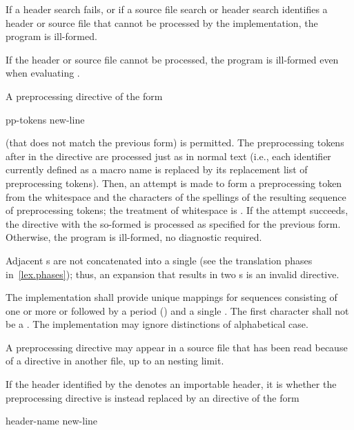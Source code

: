 \pnum
If a header search fails, or if a source file search or header search
identifies a header or source file that cannot be processed by the implementation,
the program is ill-formed.
\begin{note}
If the header or source file cannot be processed,
the program is ill-formed even when evaluating .
\end{note}

\pnum
A preprocessing directive of the form
\begin{ncsimplebnf}
 pp-tokens new-line
\end{ncsimplebnf}
(that does not match the previous form) is permitted.
The preprocessing tokens after
in the directive are processed just as in normal text
(i.e., each identifier currently defined as a macro name is replaced by its
replacement list of preprocessing tokens).
Then, an attempt is made to form a 
preprocessing token from the whitespace and the characters
of the spellings of the resulting sequence of preprocessing tokens;
the treatment of whitespace
is .
If the attempt succeeds, the directive with the so-formed 
is processed as specified for the previous form.
Otherwise, the program is ill-formed, no diagnostic required.
\begin{note}
Adjacent s are not concatenated into
a single 
(see the translation phases in~\ref{lex.phases});
thus, an expansion that results in two s is an
invalid directive.
\end{note}

\pnum
The implementation shall provide unique mappings for
sequences consisting of one or more
 or 
followed by a period
()
and a single
.
The first character shall not be a .
The implementation may ignore distinctions of alphabetical case.

\pnum
A
preprocessing directive may appear
in a source file that has been read because of a
directive in another file,
up to an  nesting limit.

\pnum
If the header identified by the 
denotes an importable header,
it is
whether the  preprocessing directive
is instead replaced by an  directive of the form
\begin{ncbnf}
 header-name \terminal{;} new-line
\end{ncbnf}

